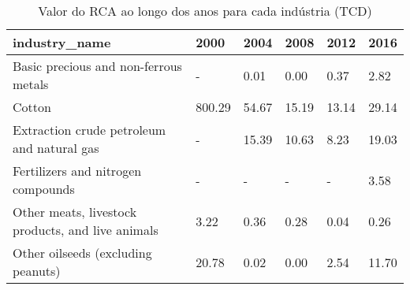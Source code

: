 \begin{table}
\centering
\caption{Valor do RCA ao longo dos anos para cada indústria (TCD)}
\begin{tabular}{p{6cm}p{1.5cm}p{1.5cm}p{1.5cm}p{1.5cm}p{1.5cm}}
\toprule
                                    industry\_name &   2000 &  2004 &  2008 &  2012 &  2016 \\
\midrule
            Basic precious and non-ferrous metals &      - &  0.01 &  0.00 &  0.37 &  2.82 \\
                                           Cotton & 800.29 & 54.67 & 15.19 & 13.14 & 29.14 \\
       Extraction crude petroleum and natural gas &      - & 15.39 & 10.63 &  8.23 & 19.03 \\
               Fertilizers and nitrogen compounds &      - &     - &     - &     - &  3.58 \\
Other meats, livestock products, and live animals &   3.22 &  0.36 &  0.28 &  0.04 &  0.26 \\
               Other oilseeds (excluding peanuts) &  20.78 &  0.02 &  0.00 &  2.54 & 11.70 \\
\bottomrule
\end{tabular}
\end{table}
